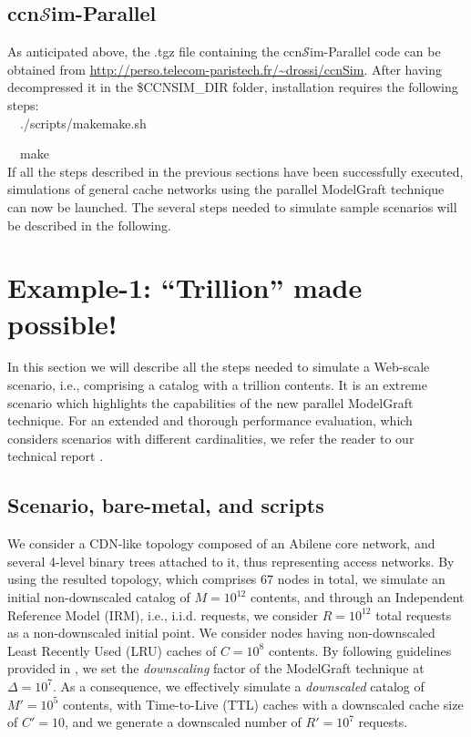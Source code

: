 \documentclass[10pt]{article}
\newcommand{\ccnsim}{ccn\ensuremath{\mathcal{S}}im} %
\newcommand{\fakeacmpar}[1]{\vspace{2 mm}\noindent{\textbf{#1.}}}
\newcommand{\colorboxg}[1]{{\colorbox{gray!20}{#1}}}
\begin{document}
\subsection*{\ccnsim-Parallel}

As anticipated above, the .tgz file containing the \ccnsim-Parallel code can be obtained from \url{http://perso.telecom-paristech.fr/~drossi/ccnSim}.
After having decompressed it in the \$CCNSIM\_DIR folder, installation requires the following steps: \\

\ \ \colorboxg{./scripts/makemake.sh}

\ \ \colorboxg{make} \\

If all the steps described in the previous sections have been successfully executed, simulations of general cache networks using the parallel ModelGraft technique can now be launched. The several steps needed to simulate sample scenarios will be described in the following.

\section*{Example-1: ``Trillion'' made possible!}
In this section we will describe all the steps needed to simulate a Web-scale scenario, i.e., comprising a catalog with a trillion contents. It is an extreme scenario which highlights the capabilities of the new parallel ModelGraft technique. For an extended and thorough performance evaluation, which considers scenarios with different cardinalities, we refer the reader to our technical report \cite{pMG_techRep}. 

\subsection*{Scenario, bare-metal, and scripts}
\fakeacmpar{Scenario} We consider a CDN-like topology composed of an Abilene core network, and several 4-level binary trees attached to it, thus representing access networks. 
By using the resulted topology, which comprises 67 nodes in total, we simulate an initial non-downscaled catalog of $M=10^{12}$ contents, and through an Independent Reference Model (IRM), i.e., i.i.d. requests, we consider $R=10^{12}$ total requests as a non-downscaled initial point. 
We consider nodes having non-downscaled Least Recently Used (LRU) caches of $C=10^{8}$ contents.
By following guidelines provided in \cite{tortelli-comnet:17}, we set the \emph{downscaling} factor of the ModelGraft technique at $\Delta=10^7$. 
As a consequence, we effectively simulate a \emph{downscaled} catalog of $M'=10^5$ contents, with Time-to-Live (TTL) caches with a downscaled cache size of $C'=10$, and we generate a downscaled number of $R'=10^7$ requests.  
\end{document}
